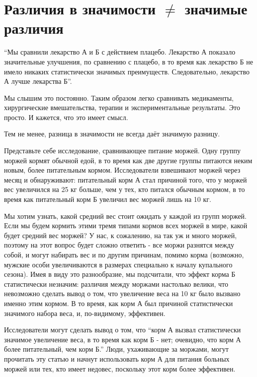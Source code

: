 \chapter{Различия в значимости $\neq$ значимые различия}
\label{chp6}

``Мы сравнили лекарство А и Б с действием плацебо. Лекарство А показало значительные улучшения, по сравнению с плацебо, в то время как лекарство Б не имело никаких статистически значимых преимуществ. Следовательно, лекарство А лучше лекарства Б''.

Мы слышим это постоянно. Таким образом легко сравнивать медикаменты, хирургические вмешательства, терапии и экспериментальные результаты. Это просто. И кажется, что это имеет смысл.

Тем не менее, разница в значимости не всегда даёт значимую разницу. \cite{gelman_difference_2006}

Представьте себе исследование, сравнивающее питание моржей. Одну группу моржей кормят обычной едой, в то время как две другие группы питаются неким новым, более питательным кормом. Исследователи взвешивают моржей через месяц и обнаруживают: питательный корм А стал причиной того, что у моржей вес увеличился на 25 кг больше, чем у тех, кто питался обычным кормом, в то время как питательный корм Б увеличил вес моржей лишь на 10 кг. 

Мы хотим узнать, какой средний вес стоит ожидать у каждой из групп моржей. Если мы будем кормить этими тремя типами кормов всех моржей в мире, какой будет средний вес моржей? У нас, к сожалению, на так уж и много моржей, поэтому на этот вопрос будет сложно ответить - все моржи разнятся между собой, и могут набирать вес и по другим причинам, помимо корма (возможно, мужские особи увеличиваются в размерах специально к началу купального сезона). Имея в виду это разнообразие, мы подсчитали, что эффект корма Б статистически незначим: различия между моржами настолько велики, что невозможно сделать вывод о том, что увеличение веса на 10 кг было вызвано именно этим кормом. В то время, как корм А был причиной статистически значимого набора веса, и, по-видимому, эффективен. 

Исследователи могут сделать вывод о том, что ``корм А вызвал статистически значимое увеличение веса, в то время как корм Б - нет; очевидно, что корм А более питательный, чем корм Б.'' Люди, ухаживающие за моржами, могут прочитать эту статью и начнут использовать корм А для питания больных моржей или тех, кто имеет недовес, поскольку этот корм более эффективен.


